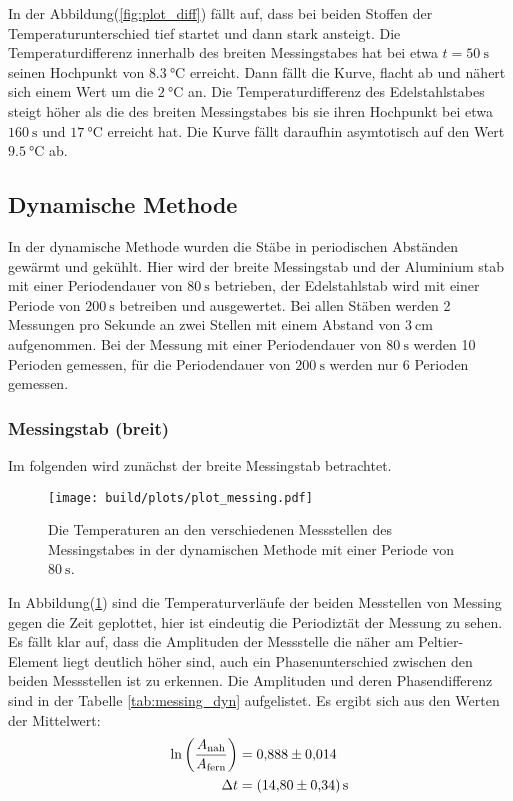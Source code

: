       \noindent In der Abbildung(\ref{fig:plot_diff}) fällt auf, dass bei beiden Stoffen der Temperaturunterschied tief startet und dann stark ansteigt.
      Die Temperaturdifferenz innerhalb des breiten Messingstabes hat bei etwa $ t = \SI{50}{\second}$ seinen Hochpunkt von $\SI{8.3}{\celsius}$ erreicht.
      Dann fällt die Kurve, flacht ab und nähert sich einem Wert um die $\SI{2}{\celsius}$ an.
      Die Temperaturdifferenz des Edelstahlstabes steigt höher als die des breiten Messingstabes bis sie ihren Hochpunkt 
      bei etwa $\SI{160}{\second} $ und $\SI{17}{\celsius}$ erreicht hat.
      Die Kurve fällt daraufhin asymtotisch auf den Wert $\SI{9.5}{\celsius}$ ab.

    \subsection{Dynamische Methode}

      \noindent In der dynamische Methode wurden die Stäbe in periodischen Abständen gewärmt und gekühlt. 
      Hier wird der breite Messingstab und der Aluminium stab mit einer Periodendauer von $\SI{80}{\second}$ betrieben, der Edelstahlstab wird 
      mit einer Periode von $\SI{200}{\second}$ betreiben und ausgewertet. Bei allen Stäben werden 2 Messungen pro Sekunde an zwei Stellen mit einem 
      Abstand von $\SI{3}{\centi\meter}$ aufgenommen. Bei der Messung mit einer Periodendauer von $\SI{80}{\second}$ werden 10 Perioden gemessen, 
      für die Periodendauer von $\SI{200}{\second}$ werden nur 6 Perioden gemessen.
        
      \subsubsection{Messingstab (breit)}

        \noindent Im folgenden wird zunächst der breite Messingstab betrachtet.

        \begin{figure}[ht]
          \centering
          \texttt{[image: build/plots/plot\_messing.pdf]}
          \caption{Die Temperaturen an den verschiedenen Messstellen des Messingstabes in der dynamischen Methode mit einer Periode von $\SI{80}{\second}$.}
          \label{fig:messing_dyn}
        \end{figure}

        \noindent In Abbildung(\ref{fig:messing_dyn}) sind die Temperaturverläufe der beiden Messtellen von Messing gegen die Zeit geplottet, hier ist 
        eindeutig die Periodiztät der Messung zu sehen. Es fällt klar auf, dass die Amplituden der Messstelle die näher am Peltier-Element liegt 
        deutlich höher sind, auch ein Phasenunterschied zwischen den beiden Messstellen ist zu erkennen.
        Die Amplituden und deren Phasendifferenz sind in der Tabelle \ref{tab:messing_dyn} aufgelistet.
        Es ergibt sich aus den Werten der Mittelwert:
        \begin{align*}
          \ln\left( \frac{A_{\text{nah}}}{A_{\text{fern}}}\right) &= \num{0.888 \pm 0.014}\\
          \Delta t &= \SI{14.8 \pm 0.34}{\second}
        \end{align*} 

